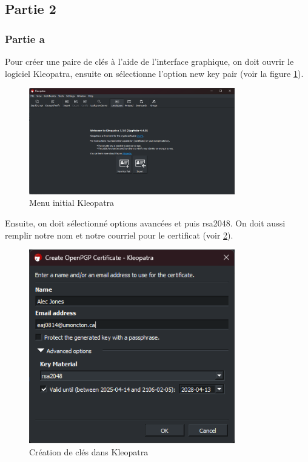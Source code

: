 \documentclass[12pt,a4paper]{article}
\begin{document}
\subsection{Partie 2}
\subsubsection{Partie a}
Pour créer une paire de clés à l'aide de l'interface graphique, on doit ouvrir le logiciel
Kleopatra, ensuite on sélectionne l'option new key pair (voir la figure \ref{kleopatra}).

\begin{figure}[h]
    \centering
    \includegraphics[width=0.8\textwidth]{../img/kleopatra.png}
    \caption{Menu initial Kleopatra}
    \label{kleopatra}
\end{figure}

Ensuite, on doit sélectionné options avancées et puis rsa2048.
On doit aussi remplir notre nom et notre courriel pour le certificat (voir \ref{newKey}).

\begin{figure}[ht]
    \centering
    \includegraphics[width=0.8\textwidth]{../img/newKey.png}
    \caption{Création de clés dans Kleopatra}
    \label{newKey}
\end{figure}
\end{document}

